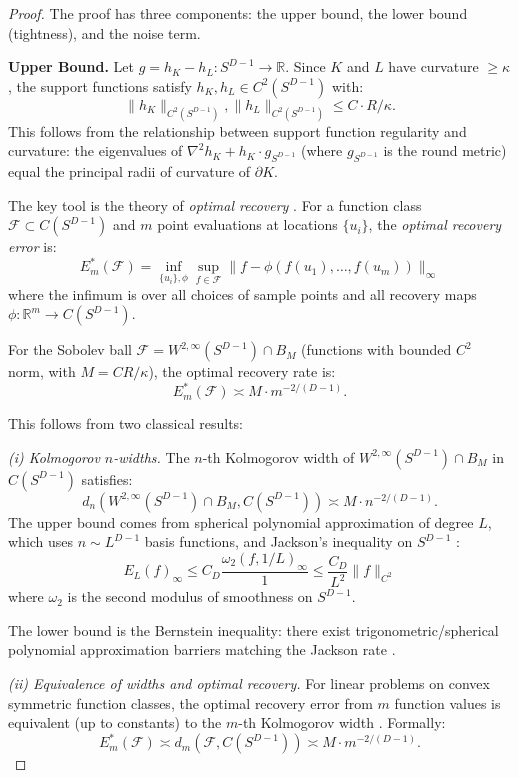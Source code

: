 \begin{proof}
The proof has three components: the upper bound, the lower bound (tightness), and the noise term.

\textbf{Upper Bound.}
Let $g = h_K - h_L : S^{D-1} \to \mathbb{R}$. Since $K$ and $L$ have curvature $\geq \kappa$, the support functions satisfy $h_K, h_L \in C^2(S^{D-1})$ with:
\[
  \|h_K\|_{C^2(S^{D-1})}, \|h_L\|_{C^2(S^{D-1})} \leq C \cdot R / \kappa.
\]
This follows from the relationship between support function regularity and curvature: the eigenvalues of $\nabla^2 h_K + h_K \cdot g_{S^{D-1}}$ (where $g_{S^{D-1}}$ is the round metric) equal the principal radii of curvature of $\partial K$.

The key tool is the theory of \emph{optimal recovery} \cite{micchelli1977survey, traub1988information}. For a function class $\mathcal{F} \subset C(S^{D-1})$ and $m$ point evaluations at locations $\{u_i\}$, the \emph{optimal recovery error} is:
\[
  E_m^*(\mathcal{F}) = \inf_{\{u_i\}, \phi} \sup_{f \in \mathcal{F}} \|f - \phi(f(u_1), \ldots, f(u_m))\|_\infty
\]
where the infimum is over all choices of sample points and all recovery maps $\phi : \mathbb{R}^m \to C(S^{D-1})$.

For the Sobolev ball $\mathcal{F} = W^{2,\infty}(S^{D-1}) \cap B_M$ (functions with bounded $C^2$ norm, with $M = CR/\kappa$), the optimal recovery rate is:
\[
  E_m^*(\mathcal{F}) \asymp M \cdot m^{-2/(D-1)}.
\]

This follows from two classical results:

\emph{(i) Kolmogorov $n$-widths.} The $n$-th Kolmogorov width of $W^{2,\infty}(S^{D-1}) \cap B_M$ in $C(S^{D-1})$ satisfies:
\[
  d_n(W^{2,\infty}(S^{D-1}) \cap B_M, C(S^{D-1})) \asymp M \cdot n^{-2/(D-1)}.
\]
The upper bound comes from spherical polynomial approximation of degree $L$, which uses $n \sim L^{D-1}$ basis functions, and Jackson's inequality on $S^{D-1}$ \cite{ragozin1970polynomial, dai2013approximation}:
\[
  E_L(f)_\infty \leq C_D \frac{\omega_2(f, 1/L)_\infty}{1} \leq \frac{C_D}{L^2} \|f\|_{C^2}
\]
where $\omega_2$ is the second modulus of smoothness on $S^{D-1}$.

The lower bound is the Bernstein inequality: there exist trigonometric/spherical polynomial approximation barriers matching the Jackson rate \cite{ditzian1990moduli}.

\emph{(ii) Equivalence of widths and optimal recovery.} For linear problems on convex symmetric function classes, the optimal recovery error from $m$ function values is equivalent (up to constants) to the $m$-th Kolmogorov width \cite{magaril1979diameters, magaril2006optimal}. Formally:
\[
  E_m^*(\mathcal{F}) \asymp d_m(\mathcal{F}, C(S^{D-1})) \asymp M \cdot m^{-2/(D-1)}.
\]


\end{proof}

